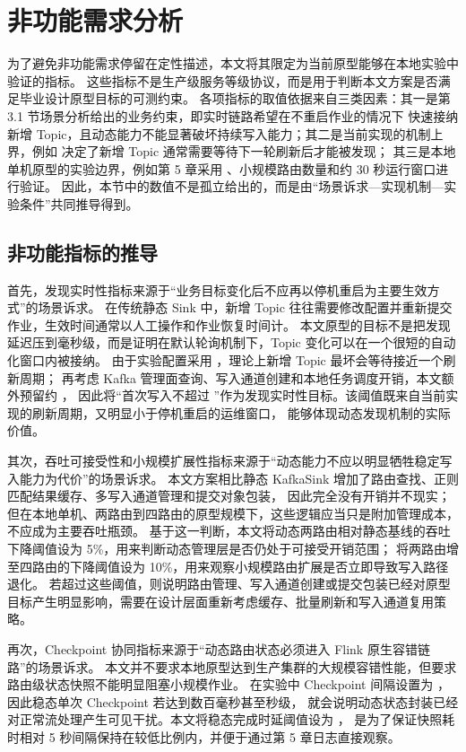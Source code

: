 \section{非功能需求分析}

为了避免非功能需求停留在定性描述，本文将其限定为当前原型能够在本地实验中验证的指标。
这些指标不是生产级服务等级协议，而是用于判断本文方案是否满足毕业设计原型目标的可测约束。
各项指标的取值依据来自三类因素：其一是第 3.1 节场景分析给出的业务约束，即实时链路希望在不重启作业的情况下
快速接纳新增 Topic，且动态能力不能显著破坏持续写入能力；其二是当前实现的机制上界，例如
 决定了新增 Topic 通常需要等待下一轮刷新后才能被发现；
其三是本地单机原型的实验边界，例如第 5 章采用 、小规模路由数量和约 30 秒运行窗口进行验证。
因此，本节中的数值不是孤立给出的，而是由“场景诉求—实现机制—实验条件”共同推导得到。

\subsection{非功能指标的推导}

首先，发现实时性指标来源于“业务目标变化后不应再以停机重启为主要生效方式”的场景诉求。
在传统静态 Sink 中，新增 Topic 往往需要修改配置并重新提交作业，生效时间通常以人工操作和作业恢复时间计。
本文原型的目标不是把发现延迟压到毫秒级，而是证明在默认轮询机制下，Topic 变化可以在一个很短的自动化窗口内被接纳。
由于实验配置采用 ，理论上新增 Topic 最坏会等待接近一个刷新周期；
再考虑 Kafka 管理面查询、写入通道创建和本地任务调度开销，本文额外预留约 ，
因此将“首次写入不超过 ”作为发现实时性目标。该阈值既来自当前实现的刷新周期，又明显小于停机重启的运维窗口，
能够体现动态发现机制的实际价值。

其次，吞吐可接受性和小规模扩展性指标来源于“动态能力不应以明显牺牲稳定写入能力为代价”的场景诉求。
本文方案相比静态 KafkaSink 增加了路由查找、正则匹配结果缓存、多写入通道管理和提交对象包装，
因此完全没有开销并不现实；但在本地单机、两路由到四路由的原型规模下，这些逻辑应当只是附加管理成本，不应成为主要吞吐瓶颈。
基于这一判断，本文将动态两路由相对静态基线的吞吐下降阈值设为 5\%，用来判断动态管理层是否仍处于可接受开销范围；
将两路由增至四路由的下降阈值设为 10\%，用来观察小规模路由扩展是否立即导致写入路径退化。
若超过这些阈值，则说明路由管理、写入通道创建或提交包装已经对原型目标产生明显影响，需要在设计层面重新考虑缓存、批量刷新和写入通道复用策略。

再次，Checkpoint 协同指标来源于“动态路由状态必须进入 Flink 原生容错链路”的场景诉求。
本文并不要求本地原型达到生产集群的大规模容错性能，但要求路由级状态快照不能明显阻塞小规模作业。
在实验中 Checkpoint 间隔设置为 ，因此稳态单次 Checkpoint 若达到数百毫秒甚至秒级，
就会说明动态状态封装已经对正常流处理产生可见干扰。本文将稳态完成时延阈值设为 ，
是为了保证快照耗时相对 5 秒间隔保持在较低比例内，并便于通过第 5 章日志直接观察。

